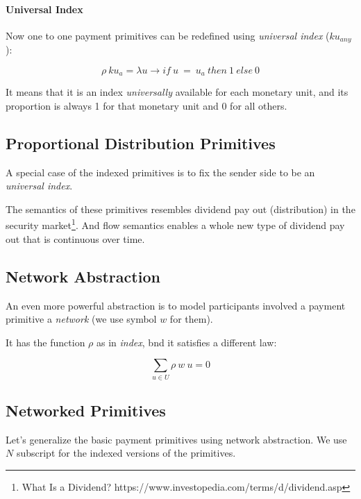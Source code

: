 \paragraph{Universal Index}

Now one to one payment primitives can be redefined using \textit{universal index} ($ku_{any}$):

\begin{equation}
    \rho\ ku_{a} = \lambda u \rightarrow if\ u\ =\ u_a\ then\ 1\ else\ 0
\end{equation}

It means that it is an index \textit{universally} available for each monetary unit, and its proportion is always 1 for
that monetary unit and 0 for all others.

\subsection{Proportional Distribution Primitives}

A special case of the indexed primitives is to fix the sender side to be an \textit{universal index}.

The semantics of these primitives resembles dividend pay out (distribution) in the security market\footnote{What Is a
Dividend?  https://www.investopedia.com/terms/d/dividend.asp}. And flow semantics enables a whole new type of dividend
pay out that is continuous over time.

\subsection{Network Abstraction}

An even more powerful abstraction is to model participants involved a payment primitive a \textit{network} (we use
symbol $w$ for them).

It has the function $\rho$ as in \textit{index}, bnd it satisfies a different law:

\begin{equation}
    \displaystyle \sum_{u \in U} \rho\ w\ u = 0
\end{equation}

\subsection{Networked Primitives}

Let's generalize the basic payment primitives using network abstraction. We use $N$ subscript for the indexed versions
of the primitives.

